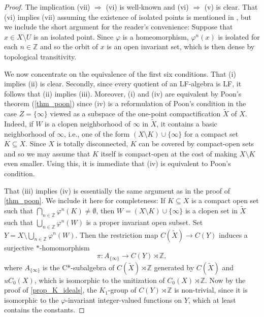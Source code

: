 \documentclass[12pt, a4paper, oneside]{amsart}
\newcommand{\0}{\mathbf{0}}
\newcommand{\1}{\mathbf{1}}
\newcommand{\Z}{\mathbb{Z}}   %
\begin{document}
	\begin{proof}
		The implication (vii) \(\Rightarrow\) (vi) is well-known and (vi) \(\Rightarrow\) (v) is clear. That (vi) implies (vii) assuming the existence of isolated points is mentioned in \cite[Proposition 5.3]{akin}, but we include the short argument for the reader's convenience: Suppose that \(x \in X \setminus U\) is an isolated point. Since \(\varphi\) is a homeomorphism, \(\varphi^n(x)\) is isolated for each \(n \in \Z\) and so the orbit of \(x\) is an open invariant set, which is then dense by topological transitivity. 
		
		We now concentrate on the equivalence of the first six conditions. That (i) implies (ii) is clear. Secondly, since every quotient of an LF-algebra is LF, it follows that (ii) implies (iii). Moreover, (i) and (iv) are equivalent by Poon's theorem (\cref{thm_poon}) since (iv) is a reformulation of Poon's condition in the case \(Z = \{ \infty \}\) viewed as a subspace of the one-point compactification \(\tilde{X}\) of \(X\). Indeed, if \(W\) is a clopen neighborhood of \(\infty\) in \(\tilde{X}\), it contains a basic neighborhood of \(\infty\), i.e., one of the form \((X \setminus K) \cup \{ \infty \}\) for a compact set \(K \subseteq X\). Since \(X\) is totally disconnected, \(K\) can be covered by compact-open sets and so we may assume that \(K\) itself is compact-open at the cost of making \(X \setminus K\) even smaller. Using this, it is immediate that (iv) is equivalent to Poon's condition. 
		
		That (iii) implies (iv) is essentially the same argument as in the proof of \cref{thm_poon}. We include it here for completeness: If \(K \subseteq X\) is a compact open set such that \(\bigcap_{n \in \Z} \varphi^n(K) \neq \emptyset\), then \(W = (X \setminus K) \cup \{ \infty \}\) is a clopen set in \(\tilde{X}\) such that \(\bigcup_{n \in \Z} \varphi^n(W)\) is a proper invariant open subset. Set \(Y = X \setminus \bigcup_{n \in \Z} \varphi^n(W)\). Then the restriction map \(C(\tilde{X}) \to C(Y)\) induces a surjective \(*\)-homomorphism \[\pi \colon A_{ \{\infty \}} \to C(Y) \rtimes  \Z,\] where \(A_{ \{\infty \}}\) is the C*-subalgebra of \(C(\tilde{X}) \rtimes  \Z\) generated by \(C(\tilde{X})\) and \(uC_0(X)\), which is isomorphic to the unitization of \(C_0(X) \rtimes  \Z\). Now by the proof of \cref{prop_K_ideals}, the \(K_1\)-group of \(C(Y) \rtimes  \Z\) is non-trivial, since it is isomorphic to the \(\varphi\)-invariant integer-valued functions on \(Y\), which at least contains the constants. 
		

\end{proof}
\end{document}
